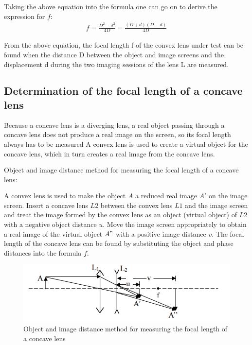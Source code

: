\documentclass[UTF8]{article}
\begin{document}
	Taking the above equation into the formula one can go on to derive the expression for $f$:
	\begin{eqnarray}
	f  =  \frac{D^2-d^2}{4D}  =  \frac{(D+d)(D-d)}{4D}  
	\end{eqnarray}
	
    From the above equation, the focal length f of the convex lens under test can be found when the distance D between the object and image screens and the displacement d during the two imaging sessions of the lens L are measured.
    
	\subsection{Determination of the focal length of a concave lens}
    Because a concave lens is a diverging lens, a real object passing through a concave lens does not produce a real image on the screen, so its focal length always has to be measured A convex lens is used to create a virtual object for the concave lens, which in turn creates a real image from the concave lens.
    
    Object and image distance method for measuring the focal length of a concave lens:
    
    A convex lens is used to make the object $A$ a reduced real image $A'$ on the image screen. Insert a concave lens $L2$ between the convex lens $L1$ and the image screen and treat the image formed by the convex lens as an object (virtual object) of $L2$ with a negative object distance $u$. Move the image screen appropriately to obtain a real image of the virtual object $A"$ with a positive image distance $v$. The focal length of the concave lens can be found by substituting the object and phase distances into the formula $f$.
    
    	\begin{figure}[H]
    	     	\centering
    	     	\includegraphics[clip,scale=1,trim={0 0 0 0}]{fig/fig9.png}
    	     	\caption{Object and image distance method for measuring the focal length of a concave lens}
    	     	\label{figure.9}
    	\end{figure}
    
\end{document}
